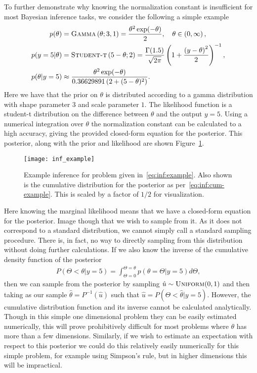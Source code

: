 To further demonstrate why knowing the normalization constant is insufficient
for most Bayesian inference tasks, we consider the following a simple example
\begin{subequations}
\label{eq:inf:example}
\begin{align}
p(\theta) &= \textsc{Gamma}\left(\theta; 3, 1\right) = \frac{\theta^2 \exp(-\theta)}{2},
 \quad \theta\in\left(0,\infty\right), \\
p(y=5|\theta) &= \textsc{Student-t}\left(5-\theta;2\right) = 
\frac{\Gamma (1.5)}{\sqrt{2\pi}}\left(1+\frac{\left(y-\theta\right)^2}{2}\right)^{-1}, \\
p(\theta |y=5) &\approx \frac{\theta^2
	 \exp(-\theta)}{0.36629891\left(2+(5-\theta)^2\right)} \label{eq:inf:example-post}.
\end{align}
\end{subequations}
Here we have that the prior on $\theta$ is distributed according to a gamma
distribution with shape parameter $3$ and scale parameter $1$.  The likelihood
function is a student-t distribution on the difference between $\theta$ and the
output $y=5$.  Using a numerical integration over $\theta$ the normalization
constant can be calculated to a high accuracy, giving the provided closed-form
equation for the posterior.  This posterior, along with the prior and likelihood are shown Figure~\ref{fig:inf:inf-example}.

\begin{figure}[t]
	\centering
	\texttt{[image: inf\_example]}
	\caption{Example inference for problem given
		in~\eqref{eq:inf:example}. Also shown is the cumulative distribution for
		the posterior as per~\eqref{eq:inf:cum-example}.  This is scaled by a factor
		of $1/2$ for visualization.  \label{fig:inf:inf-example}}
\end{figure}

Here knowing the marginal likelihood means that we have a 
closed-form equation for the posterior.  Image though that we 
wish to sample from it.  As it does not correspond to a standard distribution,
we cannot simply call a standard sampling procedure.  There is, in fact, no way
to directly sampling from this distribution without doing further calculations.  If
we also know the inverse of the cumulative density function of the posterior
\begin{align}
\label{eq:inf:cum-example}
P(\Theta<\theta | y=5) = \int_{\Theta=0}^{\Theta=\theta}  p(\theta=\Theta | y=5) d\Theta,
\end{align}
then we can sample from the posterior by sampling $\hat{u} \sim \textsc{Uniform}(0,1)$ and
then taking as our sample $\hat{\theta} = P^{-1}(\hat{u})$ such that 
$\hat{u} = P(\Theta<\hat{\theta} | y=5)$.  However, the cumulative distribution function
and its inverse cannot be calculated analytically.  Though in this simple one dimensional
problem they can be easily estimated numerically, this will prove prohibitively difficult
for most problems where $\theta$ has more than a few dimensions.  Similarly, if we
wish to estimate an expectation with respect to this posterior we could do this relatively
easily numerically for this simple problem, for example using Simpson's rule, but in higher
dimensions this will be impractical.

